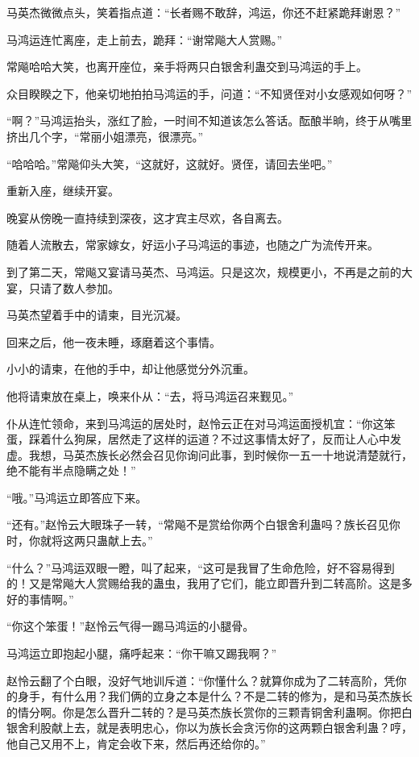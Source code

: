 \begin{this_body}
马英杰微微点头，笑着指点道：“长者赐不敢辞，鸿运，你还不赶紧跪拜谢恩？”

马鸿运连忙离座，走上前去，跪拜：“谢常飚大人赏赐。”

常飚哈哈大笑，也离开座位，亲手将两只白银舍利蛊交到马鸿运的手上。

众目睽睽之下，他亲切地拍拍马鸿运的手，问道：“不知贤侄对小女感观如何呀？”

“啊？”马鸿运抬头，涨红了脸，一时间不知道该怎么答话。酝酿半晌，终于从嘴里挤出几个字，“常丽小姐漂亮，很漂亮。”

“哈哈哈。”常飚仰头大笑，“这就好，这就好。贤侄，请回去坐吧。”

重新入座，继续开宴。

晚宴从傍晚一直持续到深夜，这才宾主尽欢，各自离去。

随着人流散去，常家嫁女，好运小子马鸿运的事迹，也随之广为流传开来。

到了第二天，常飚又宴请马英杰、马鸿运。只是这次，规模更小，不再是之前的大宴，只请了数人参加。

马英杰望着手中的请柬，目光沉凝。

回来之后，他一夜未睡，琢磨着这个事情。

小小的请柬，在他的手中，却让他感觉分外沉重。

他将请柬放在桌上，唤来仆从：“去，将马鸿运召来觐见。”

仆从连忙领命，来到马鸿运的居处时，赵怜云正在对马鸿运面授机宜：“你这笨蛋，踩着什么狗屎，居然走了这样的运道？不过这事情太好了，反而让人心中发虚。我想，马英杰族长必然会召见你询问此事，到时候你一五一十地说清楚就行，绝不能有半点隐瞒之处！”

“哦。”马鸿运立即答应下来。

“还有。”赵怜云大眼珠子一转，“常飚不是赏给你两个白银舍利蛊吗？族长召见你时，你就将这两只蛊献上去。”

“什么？”马鸿运双眼一瞪，叫了起来，“这可是我冒了生命危险，好不容易得到的！又是常飚大人赏赐给我的蛊虫，我用了它们，能立即晋升到二转高阶。这是多好的事情啊。”

“你这个笨蛋！”赵怜云气得一踢马鸿运的小腿骨。

马鸿运立即抱起小腿，痛呼起来：“你干嘛又踢我啊？”

赵怜云翻了个白眼，没好气地训斥道：“你懂什么？就算你成为了二转高阶，凭你的身手，有什么用？我们俩的立身之本是什么？不是二转的修为，是和马英杰族长的情分啊。你是怎么晋升二转的？是马英杰族长赏你的三颗青铜舍利蛊啊。你把白银舍利股献上去，就是表明忠心，你以为族长会贪污你的这两颗白银舍利蛊？哼，他自己又用不上，肯定会收下来，然后再还给你的。”


\end{this_body}
